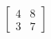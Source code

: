 \documentclass[preview]{standalone}
\begin{document}
\begin{align*}
\begin{bmatrix}
                        4 & 8\\
                        3 & 7
                    \end{bmatrix}
\end{align*}
\end{document}
